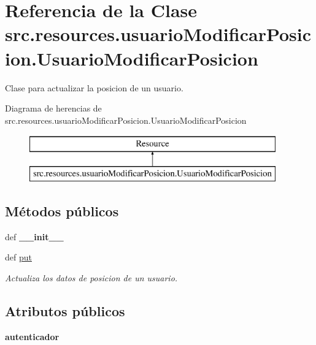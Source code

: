 \hypertarget{classsrc_1_1resources_1_1usuario_modificar_posicion_1_1_usuario_modificar_posicion}{\section{Referencia de la Clase src.\-resources.\-usuario\-Modificar\-Posicion.\-Usuario\-Modificar\-Posicion}
\label{classsrc_1_1resources_1_1usuario_modificar_posicion_1_1_usuario_modificar_posicion}
}


Clase para actualizar la posicion de un usuario.  


Diagrama de herencias de src.\-resources.\-usuario\-Modificar\-Posicion.\-Usuario\-Modificar\-Posicion\begin{figure}[H]
\begin{center}
\leavevmode
\includegraphics[height=2.000000cm]{classsrc_1_1resources_1_1usuario_modificar_posicion_1_1_usuario_modificar_posicion}
\end{center}
\end{figure}
\subsection*{Métodos públicos}
\begin{DoxyCompactItemize}
\item 
\hypertarget{classsrc_1_1resources_1_1usuario_modificar_posicion_1_1_usuario_modificar_posicion_a3510528dc54022281dbc9a5756507bec}{def {\bfseries \-\_\-\-\_\-init\-\_\-\-\_\-}}\label{classsrc_1_1resources_1_1usuario_modificar_posicion_1_1_usuario_modificar_posicion_a3510528dc54022281dbc9a5756507bec}

\item 
def \hyperlink{classsrc_1_1resources_1_1usuario_modificar_posicion_1_1_usuario_modificar_posicion_aa836c3ed2ae1d5124b5f093b99c789d0}{put}
\begin{DoxyCompactList}\small\item\em Actualiza los datos de posicion de un usuario. \end{DoxyCompactList}\end{DoxyCompactItemize}
\subsection*{Atributos públicos}
\begin{DoxyCompactItemize}
\item 
\hypertarget{classsrc_1_1resources_1_1usuario_modificar_posicion_1_1_usuario_modificar_posicion_a45af22de264a650894690011ae1a1489}{{\bfseries autenticador}}\label{classsrc_1_1resources_1_1usuario_modificar_posicion_1_1_usuario_modificar_posicion_a45af22de264a650894690011ae1a1489}

\end{DoxyCompactItemize}
